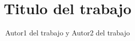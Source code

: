 \documentclass[final,fmstyle]{./util/fpunathesis}
\title{Titulo del trabajo}
\author{Autor1 del trabajo y Autor2 del trabajo}
\begin{document}
\maketitle     %

%


\tableofcontents
\listoffigures
\listoftables
\listofalgorithms
%
\listofsymbols


\mainmatter  %



%
%
%
%
%
%

\appendix   %
%
\printbibliography
\end{document}
